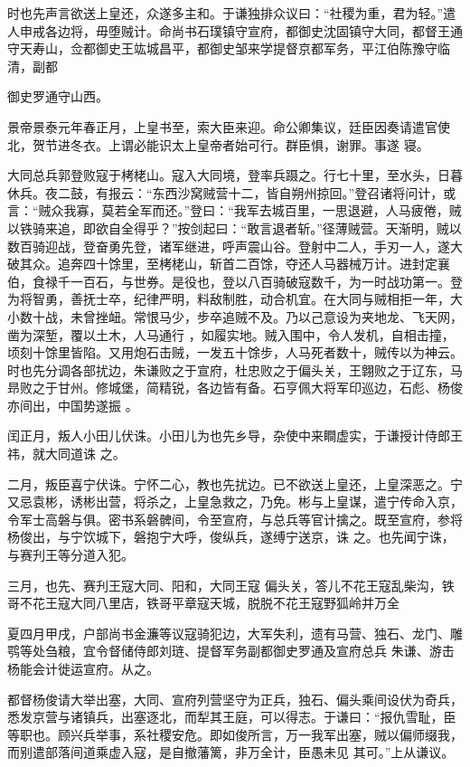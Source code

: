 \documentclass{article}
\begin{document}
时也先声言欲送上皇还，众遂多主和。于谦独排众议曰：“社稷为重，君为轻。”遣人申戒各边将，毋堕贼计。命尚书石璞镇守宣府，都御史沈固镇守大同，都督王通守天寿山，佥都御史王竑城昌平，都御史邹来学提督京都军务，平江伯陈豫守临清，副都

\newpage
御史罗通守山西。 

景帝景泰元年春正月，上皇书至，索大臣来迎。命公卿集议，廷臣因奏请遣官使北，贺节进冬衣。上谓必能识太上皇帝者始可行。群臣惧，谢罪。事遂
寝。 

大同总兵郭登败寇于栲栳山。寇入大同境，登率兵蹑之。行七十里，至水头，日暮休兵。夜二鼓，有报云：“东西沙窝贼营十二，皆自朔州掠回。”登召诸将问计，或言：“贼众我寡，莫若全军而还。”登曰：“我军去城百里，一思退避，人马疲倦，贼以铁骑来追，即欲自全得乎？”按剑起曰：“敢言退者斩。”径薄贼营。天渐明，贼以数百骑迎战，登奋勇先登，诸军继进，呼声震山谷。登射中二人，手刃一人，遂大破其众。追奔四十馀里，至栲栳山，斩首二百馀，夺还人马器械万计。进封定襄伯，食禄千一百石，与世券。是役也，登以八百骑破寇数千，为一时战功第一。登为将智勇，善抚士卒，纪律严明，料敌制胜，动合机宜。在大同与贼相拒一年，大小数十战，未曾挫衄。常恨马少，步卒追贼不及。乃以己意设为夹地龙、飞天网，凿为深堑，覆以土木，人马通行
\newpage
，如履实地。贼入围中，令人发机，自相击撞，顷刻十馀里皆陷。又用炮石击贼，一发五十馀步，人马死者数十，贼传以为神云。时也先分调各部扰边，朱谦败之于宣府，杜忠败之于偏头关，王翺败之于辽东，马昻败之于甘州。修城堡，简精锐，各边皆有备。石亨佩大将军印巡边，石彪、杨俊亦间出，中国势遂振
。 

闰正月，叛人小田儿伏诛。小田儿为也先乡导，杂使中来瞷虚实，于谦授计侍郎王祎，就大同道诛
之。 

二月，叛臣喜宁伏诛。宁怀二心，教也先扰边。已不欲送上皇还，上皇深恶之。宁又忌袁彬，诱彬出营，将杀之，上皇急救之，乃免。彬与上皇谋，遣宁传命入京，令军士高磐与俱。密书系磐髀间，令至宣府，与总兵等官计擒之。既至宣府，参将杨俊出，与宁饮城下，磐抱宁大呼，俊纵兵，遂缚宁送京，诛
之。也先闻宁诛，与赛刋王等分道入犯。 

三月，也先、赛刋王寇大同、阳和，大同王寇
\newpage
偏头关，答儿不花王寇乱柴沟，铁哥不花王寇大同八里店，铁哥平章寇天城，脱脱不花王寇野狐岭并万全

夏四月甲戌，户部尚书金濂等议寇骑犯边，大军失利，遗有马营、独石、龙门、雕鹗等处刍粮，宜令督储侍郎刘琏、提督军务副都御史罗通及宣府总兵
朱谦、游击杨能会计徙运宣府。从之。 

都督杨俊请大举出塞，大同、宣府列营坚守为正兵，独石、偏头乘间设伏为奇兵，悉发京营与诸镇兵，出塞逐北，而犁其王庭，可以得志。于谦曰：“报仇雪耻，臣等职也。顾兴兵举事，系社稷安危。即如俊所言，万一我军出塞，贼以偏师缀我，而别遣部落间道乘虚入寇，是自撤藩篱，非万全计，臣愚未见
其可。”上从谦议。 
\end{document}
